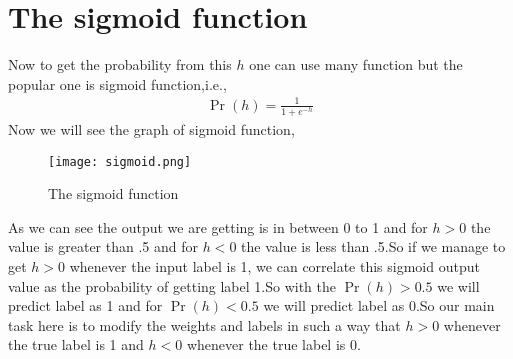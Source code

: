\documentclass[journal,12pt,onecolumn]{IEEEtran}
\providecommand{\pr}[1]{\ensuremath{\Pr\left(#1\right)}}
\theoremstyle{remark}
\numberwithin{equation}{section}
\begin{document}
		\section{The sigmoid function}	 
		Now to get the probability from this $h$ one can use many function but the popular one is sigmoid function,i.e.,
		\begin{align}
			\pr{h} = \frac{1}{1 + e^{-h}}\label{eq:2}
		\end{align}
		Now we will see the graph of sigmoid function,
		\begin{figure}
			\centering
			\texttt{[image: sigmoid.png]}
			\caption{The sigmoid function}
			\label{Fig:1}
		\end{figure}
		As we can see the output we are getting is in between 0 to 1 and for $h > 0$ the value is greater than .5 and for $h<0$ the value is less than .5.So if we manage to get $h>0$ whenever the input label is 1, we can correlate this sigmoid output value as the probability of getting label 1.So with the $\pr{h} >0.5$ we will predict label as 1 and for $\pr{h}<0.5$ we will predict label as 0.So our main task here is to modify the weights and labels in such a way that $h>0$ whenever the true label is 1 and $h<0$ whenever the true label is 0.   
\end{document}
